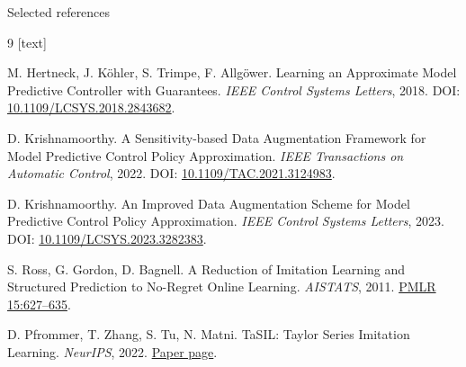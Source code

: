 \documentclass[aspectratio=169,10pt]{beamer}
\begin{document}
\begin{frame}{Selected references}
\scriptsize
\begin{thebibliography}{9}
[text]

M. Hertneck, J. K\"ohler, S. Trimpe, F. Allg\"ower.
\newblock Learning an Approximate Model Predictive Controller with Guarantees.
\newblock \emph{IEEE Control Systems Letters}, 2018. DOI: \href{https://doi.org/10.1109/LCSYS.2018.2843682}{10.1109/LCSYS.2018.2843682}.

D. Krishnamoorthy.
\newblock A Sensitivity-based Data Augmentation Framework for Model Predictive Control Policy Approximation.
\newblock \emph{IEEE Transactions on Automatic Control}, 2022. DOI: \href{https://doi.org/10.1109/TAC.2021.3124983}{10.1109/TAC.2021.3124983}.

D. Krishnamoorthy.
\newblock An Improved Data Augmentation Scheme for Model Predictive Control Policy Approximation.
\newblock \emph{IEEE Control Systems Letters}, 2023. DOI: \href{https://doi.org/10.1109/LCSYS.2023.3282383}{10.1109/LCSYS.2023.3282383}.

S. Ross, G. Gordon, D. Bagnell.
\newblock A Reduction of Imitation Learning and Structured Prediction to No-Regret Online Learning.
\newblock \emph{AISTATS}, 2011. \href{https://proceedings.mlr.press/v15/ross11a.html}{PMLR 15:627--635}.

D. Pfrommer, T. Zhang, S. Tu, N. Matni.
\newblock TaSIL: Taylor Series Imitation Learning.
\newblock \emph{NeurIPS}, 2022. \href{https://proceedings.neurips.cc/paper_files/paper/2022/hash/7f10c3d66c3b7863a9cda255dcac5bb7-Abstract-Conference.html}{Paper page}.

\end{thebibliography}
\end{frame}
\end{document}
